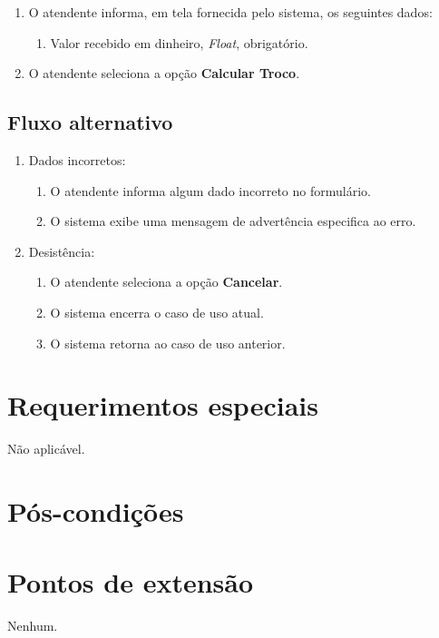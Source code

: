 \begin{enumerate}
	\item O atendente informa, em tela fornecida pelo sistema, os seguintes dados:
	\begin{enumerate}
		\item Valor recebido em dinheiro, \emph{Float}, obrigatório.		
	\end{enumerate}
	\item O atendente seleciona a opção \textbf{Calcular Troco}.
\end{enumerate}

\subsection{Fluxo alternativo}

\begin{enumerate}
	\item Dados incorretos:
	\begin{enumerate}
		\item O atendente informa algum dado incorreto no formulário. 
		\item O sistema exibe uma mensagem de advertência especifica ao erro.
	\end{enumerate}	
	\item Desistência:
	\begin{enumerate}
		\item O atendente seleciona a opção \textbf{Cancelar}.
		\item O sistema encerra o caso de uso atual.
		\item O sistema retorna ao caso de uso anterior.
	\end{enumerate}
\end{enumerate}

\section{Requerimentos especiais}

Não aplicável.

\section{Pós-condições}

\section{Pontos de extensão}

Nenhum.